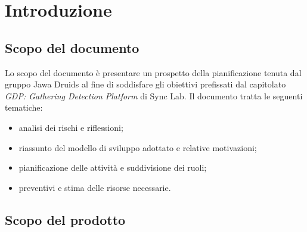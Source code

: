 \chapter{Introduzione}

\section{Scopo del documento}
Lo scopo del documento è presentare un prospetto della pianificazione tenuta dal gruppo Jawa Druids al fine di soddisfare gli obiettivi prefissati dal capitolato \textit{GDP: Gathering Detection Platform} di Sync Lab. Il documento tratta le seguenti tematiche:
\begin{itemize}
\item analisi dei rischi e riflessioni;
\item riassunto del modello di sviluppo adottato e relative motivazioni;
\item pianificazione delle attività e suddivisione dei ruoli;
\item preventivi e stima delle risorse necessarie.
\end{itemize}

\section{Scopo del prodotto}
